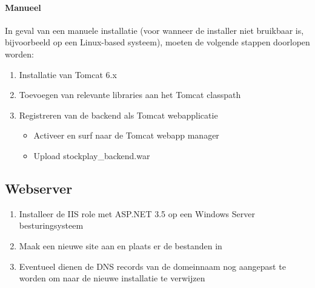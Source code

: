 \paragraph{Manueel}
In geval van een manuele installatie (voor wanneer de installer niet bruikbaar is, bijvoorbeeld op een Linux-based systeem), moeten de volgende stappen doorlopen worden:
\begin{enumerate}
\item Installatie van Tomcat 6.x
\item Toevoegen van relevante libraries aan het Tomcat classpath
\item Registreren van de backend als Tomcat webapplicatie
\begin{itemize}
\item Activeer en surf naar de Tomcat webapp manager
\item Upload stockplay\_backend.war
\end{itemize}
\end{enumerate}

\subsection{Webserver}

\begin{enumerate}
\item{Installeer de IIS role met ASP.NET 3.5 op een Windows Server besturingsysteem}
\item{Maak een nieuwe site aan en plaats er de bestanden in}
\item{Eventueel dienen de DNS records van de domeinnaam nog aangepast te worden om naar de nieuwe installatie te verwijzen}
\end{enumerate}

